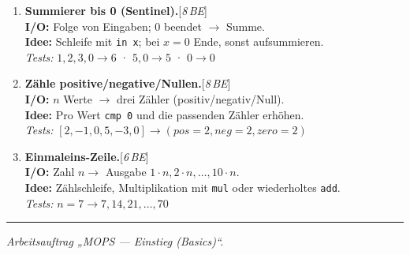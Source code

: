 \documentclass[11pt,a4paper]{scrartcl}
\newenvironment{aufgaben}{%
	\begin{enumerate}[leftmargin=*,label=\textbf{Aufgabe~\arabic*:}, itemsep=0.6em]
	}{\end{enumerate}}
\newcommand{\punkte}[1]{\hfill{\small[\textit{#1\,BE}]}}%
\begin{document}
	\begin{aufgaben}
		
		\item \textbf{Summierer bis 0 (Sentinel).}\punkte{8}\\
		\textbf{I/O:} Folge von Eingaben; $0$ beendet $\rightarrow$ Summe.\\
		\textbf{Idee:} Schleife mit \texttt{in x}; bei $x=0$ Ende, sonst aufsummieren.\\
		\emph{Tests:} $1,2,3,0\to 6$ \;·\; $5,0\to 5$ \;·\; $0\to 0$
		
		\item \textbf{Zähle positive/negative/Nullen.}\punkte{8}\\
		\textbf{I/O:} $n$ Werte $\rightarrow$ drei Zähler (positiv/negativ/Null).\\
		\textbf{Idee:} Pro Wert \texttt{cmp 0} und die passenden Zähler erhöhen.\\
		\emph{Tests:} $[2,-1,0,5,-3,0]\to (pos=2,neg=2,zero=2)$
		
		\item \textbf{Einmaleins-Zeile.}\punkte{6}\\
		\textbf{I/O:} Zahl $n \rightarrow$ Ausgabe $1\cdot n, 2\cdot n, \dots, 10\cdot n$.\\
		\textbf{Idee:} Zählschleife, Multiplikation mit \texttt{mul} oder wiederholtes \texttt{add}.\\
		\emph{Tests:} $n=7\to 7,14,21,\dots,70$
		
	\end{aufgaben}
	
	\vfill
	\hrule
	\small\emph{Arbeitsauftrag „MOPS — Einstieg (Basics)“.}
	
\end{document}
